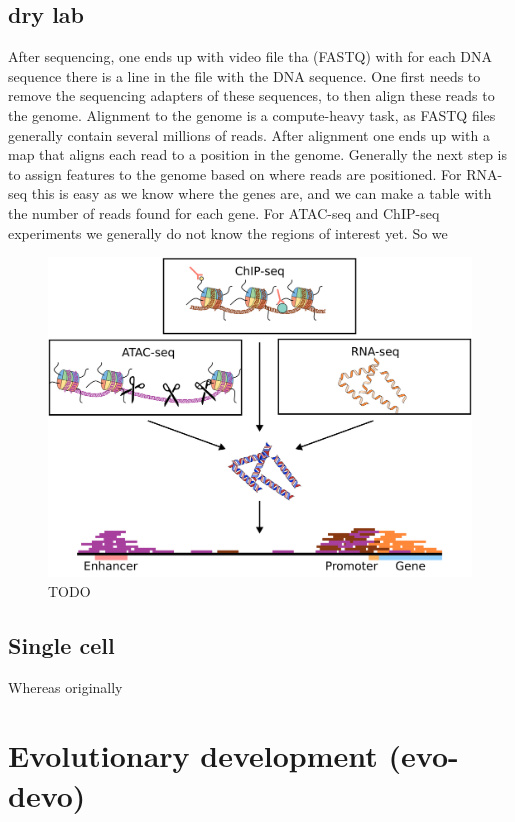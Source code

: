 \subsection{dry lab}

After sequencing, one ends up with video file tha (FASTQ) with for each DNA sequence there is a line in the file with the DNA sequence. One first needs to remove the sequencing adapters of these sequences, to then align these reads to the genome. Alignment to the genome is a compute-heavy task, as FASTQ files generally contain several millions of reads. After alignment one ends up with a map that aligns each read to a position in the genome. Generally the next step is to assign features to the genome based on where reads are positioned. For RNA-seq this is easy as we know where the genes are, and we can make a table with the number of reads found for each gene. For ATAC-seq and ChIP-seq experiments we generally do not know the regions of interest yet. So we 

\begin{figure}[H]
    \includegraphics[width=\linewidth]{ch.introduction/imgs/analysis.png}
    \caption{TODO}
    \label{fig:analysis}
\end{figure}

\subsection{Single cell}

Whereas originally 

\section{Evolutionary development (evo-devo)}

